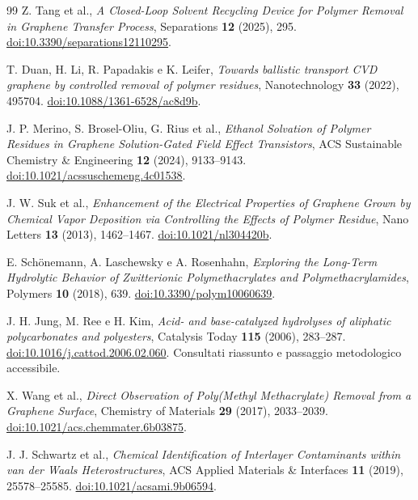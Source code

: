 \documentclass[11pt,reqno]{amsart}
\numberwithin{equation}{section}
\begin{document}
\begin{thebibliography}{99}
Z. Tang et al., \emph{A Closed-Loop Solvent Recycling Device for Polymer
Removal in Graphene Transfer Process}, Separations \textbf{12} (2025), 295.
\href{https://doi.org/10.3390/separations12110295}{doi:10.3390/separations12110295}.

T. Duan, H. Li, R. Papadakis e K. Leifer,
\emph{Towards ballistic transport CVD graphene by controlled removal of
polymer residues}, Nanotechnology \textbf{33} (2022), 495704.
\href{https://doi.org/10.1088/1361-6528/ac8d9b}{doi:10.1088/1361-6528/ac8d9b}.

J. P. Merino, S. Brosel-Oliu, G. Rius et al.,
\emph{Ethanol Solvation of Polymer Residues in Graphene Solution-Gated
Field Effect Transistors}, ACS Sustainable Chemistry \& Engineering
\textbf{12} (2024), 9133--9143.
\href{https://doi.org/10.1021/acssuschemeng.4c01538}{doi:10.1021/acssuschemeng.4c01538}.

J. W. Suk et al., \emph{Enhancement of the Electrical Properties of Graphene
Grown by Chemical Vapor Deposition via Controlling the Effects of Polymer Residue},
Nano Letters \textbf{13} (2013), 1462--1467.
\href{https://doi.org/10.1021/nl304420b}{doi:10.1021/nl304420b}.

E. Sch\"onemann, A. Laschewsky e A. Rosenhahn,
\emph{Exploring the Long-Term Hydrolytic Behavior of Zwitterionic
Polymethacrylates and Polymethacrylamides}, Polymers \textbf{10} (2018), 639.
\href{https://doi.org/10.3390/polym10060639}{doi:10.3390/polym10060639}.

J. H. Jung, M. Ree e H. Kim,
\emph{Acid- and base-catalyzed hydrolyses of aliphatic polycarbonates and
polyesters}, Catalysis Today \textbf{115} (2006), 283--287.
\href{https://doi.org/10.1016/j.cattod.2006.02.060}{doi:10.1016/j.cattod.2006.02.060}.
Consultati riassunto e passaggio metodologico accessibile.

X. Wang et al., \emph{Direct Observation of Poly(Methyl Methacrylate)
Removal from a Graphene Surface}, Chemistry of Materials
\textbf{29} (2017), 2033--2039.
\href{https://doi.org/10.1021/acs.chemmater.6b03875}{doi:10.1021/acs.chemmater.6b03875}.

J. J. Schwartz et al., \emph{Chemical Identification of Interlayer
Contaminants within van der Waals Heterostructures},
ACS Applied Materials \& Interfaces \textbf{11} (2019), 25578--25585.
\href{https://doi.org/10.1021/acsami.9b06594}{doi:10.1021/acsami.9b06594}.


\end{thebibliography}
\end{document}

